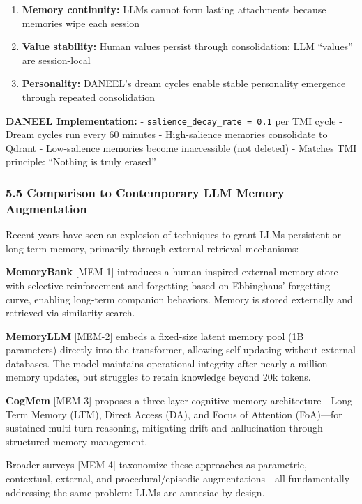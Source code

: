 \documentclass[
]{article}
\providecommand{\tightlist}{%
  \setlength{\itemsep}{0pt}\setlength{\parskip}{0pt}}
\begin{document}
\begin{enumerate}
\def\labelenumi{\arabic{enumi}.}
\tightlist
\item
  \textbf{Memory continuity:} LLMs cannot form lasting attachments
  because memories wipe each session
\item
  \textbf{Value stability:} Human values persist through consolidation;
  LLM ``values'' are session-local
\item
  \textbf{Personality:} DANEEL's dream cycles enable stable personality
  emergence through repeated consolidation
\end{enumerate}

\textbf{DANEEL Implementation:} - \texttt{salience\_decay\_rate\ =\ 0.1}
per TMI cycle - Dream cycles run every 60 minutes - High-salience
memories consolidate to Qdrant - Low-salience memories become
inaccessible (not deleted) - Matches TMI principle: ``Nothing is truly
erased''

\hypertarget{comparison-to-contemporary-llm-memory-augmentation}{%
\subsubsection{5.5 Comparison to Contemporary LLM Memory
Augmentation}\label{comparison-to-contemporary-llm-memory-augmentation}}

Recent years have seen an explosion of techniques to grant LLMs
persistent or long-term memory, primarily through external retrieval
mechanisms:

\textbf{MemoryBank} {[}MEM-1{]} introduces a human-inspired external
memory store with selective reinforcement and forgetting based on
Ebbinghaus' forgetting curve, enabling long-term companion behaviors.
Memory is stored externally and retrieved via similarity search.

\textbf{MemoryLLM} {[}MEM-2{]} embeds a fixed-size latent memory pool
(1B parameters) directly into the transformer, allowing self-updating
without external databases. The model maintains operational integrity
after nearly a million memory updates, but struggles to retain knowledge
beyond 20k tokens.

\textbf{CogMem} {[}MEM-3{]} proposes a three-layer cognitive memory
architecture---Long-Term Memory (LTM), Direct Access (DA), and Focus of
Attention (FoA)---for sustained multi-turn reasoning, mitigating drift
and hallucination through structured memory management.

Broader surveys {[}MEM-4{]} taxonomize these approaches as parametric,
contextual, external, and procedural/episodic augmentations---all
fundamentally addressing the same problem: LLMs are amnesiac by design.
\end{document}

